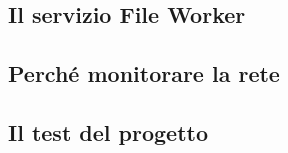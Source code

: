 
\subsection{Il servizio File Worker}



\subsection{Perché monitorare la rete}


\subsection{Il test del progetto}
